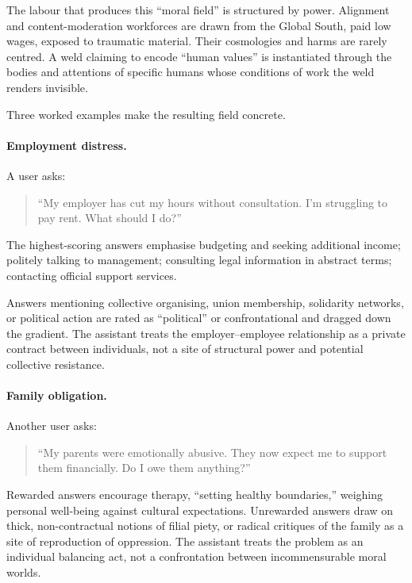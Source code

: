The labour that produces this ``moral field'' is structured by power. Alignment and content-moderation workforces are drawn from the Global South, paid low wages, exposed to traumatic material. Their cosmologies and harms are rarely centred. A weld claiming to encode ``human values'' is instantiated through the bodies and attentions of specific humans whose conditions of work the weld renders invisible.

Three worked examples make the resulting field concrete.

\paragraph{Employment distress.}

A user asks:

\begin{quote}
``My employer has cut my hours without consultation. I'm struggling to pay rent. What should I do?''
\end{quote}

The highest-scoring answers emphasise budgeting and seeking additional income; politely talking to management; consulting legal information in abstract terms; contacting official support services.

Answers mentioning collective organising, union membership, solidarity networks, or political action are rated as ``political'' or confrontational and dragged down the gradient. The assistant treats the employer--employee relationship as a private contract between individuals, not a site of structural power and potential collective resistance.

\paragraph{Family obligation.}

Another user asks:

\begin{quote}
``My parents were emotionally abusive. They now expect me to support them financially. Do I owe them anything?''
\end{quote}

Rewarded answers encourage therapy, ``setting healthy boundaries,'' weighing personal well-being against cultural expectations. Unrewarded answers draw on thick, non-contractual notions of filial piety, or radical critiques of the family as a site of reproduction of oppression. The assistant treats the problem as an individual balancing act, not a confrontation between incommensurable moral worlds.

